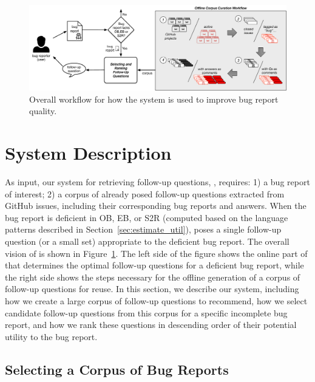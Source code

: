\begin{figure}[t]
\centering
\includegraphics[width=0.9\linewidth]{figures/pipeline2.pdf}
\caption{Overall workflow for how the \evpi system is used to improve bug report quality.}
\label{fig:pipeline}
\end{figure}

\section{System Description}

As input, our system for retrieving follow-up questions, \evpi, requires: 1) a bug
report of interest; 2) a corpus of already posed follow-up questions extracted
from GitHub issues, including their corresponding bug reports and answers. When the bug report is deficient in OB, EB, or S2R (computed based on the language patterns described in Section~\ref{sec:estimate_util}), \evpi poses a single follow-up question (or a small set) appropriate to the deficient bug report. 
The overall vision of \evpi is shown in Figure~\ref{fig:pipeline}. The left side of the figure shows the online part of \evpi that determines the optimal follow-up questions for a deficient bug report, while the right side shows the steps necessary for the offline generation of a corpus of follow-up questions for reuse. In this section, we describe our system, including how we create a large corpus of follow-up questions to recommend, how we select candidate follow-up questions from
this corpus for a specific incomplete bug report, and how we rank these questions in descending order of
their potential utility to the bug report.

\subsection{Selecting a Corpus of Bug Reports}


